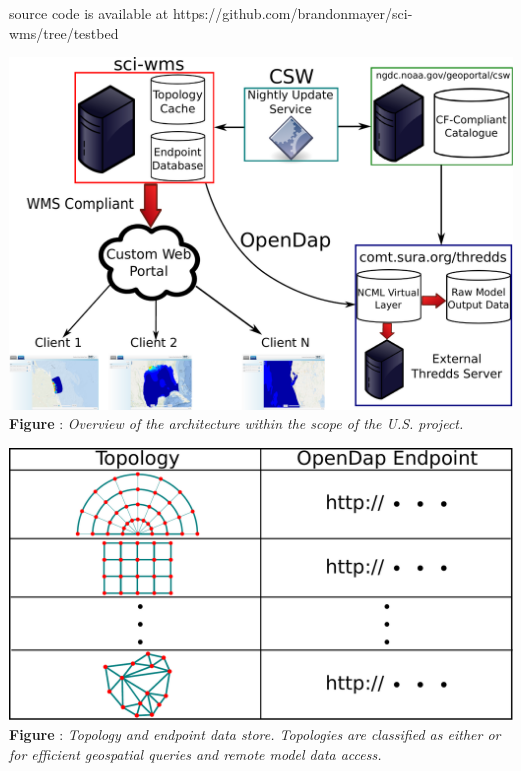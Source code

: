 \documentclass[noback,noborder,portrait,twocolumn]{cuposter}
\begin{document}
\sciwms{} source code is available at https://github.com/brandonmayer/sci-wms/tree/testbed

\begin{minipage}[r]{\linewidth}
  \centering
  \includegraphics[width=\linewidth]{../figs/overview.pdf}
  \captionspace{}
  \textbf{Figure \getIncFigcounter{}}: \textit{Overview of the \sciwms{} architecture within the scope of the U.S. \ioos{} \comt{} project.}
\end{minipage}

\begin{minipage}[t]{\linewidth}
  \centering
  \includegraphics[width=\linewidth]{../figs/sciwms_db_topology_endpoints.pdf}
  \textbf{Figure \getIncFigcounter{}}: \textit{Topology and endpoint data store. Topologies are classified as either \cgrid{} or \ugrid{} for efficient geospatial queries and remote model data access.}
\end{minipage}
\end{document}
